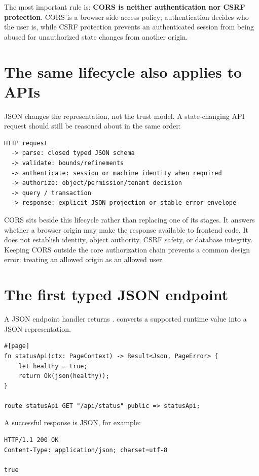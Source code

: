 The most important rule is: \textbf{CORS is neither authentication nor CSRF protection}. CORS is a browser-side access policy; authentication decides who the user is, while CSRF protection prevents an authenticated session from being abused for unauthorized state changes from another origin.

\section{The same lifecycle also applies to APIs}

JSON changes the representation, not the trust model. A state-changing API request should still be reasoned about in the same order:

\begin{lstlisting}
HTTP request
  -> parse: closed typed JSON schema
  -> validate: bounds/refinements
  -> authenticate: session or machine identity when required
  -> authorize: object/permission/tenant decision
  -> query / transaction
  -> response: explicit JSON projection or stable error envelope
\end{lstlisting}

CORS sits beside this lifecycle rather than replacing one of its stages. It answers whether a browser origin may make the response available to frontend code. It does not establish identity, object authority, CSRF safety, or database integrity. Keeping CORS outside the core authorization chain prevents a common design error: treating an allowed origin as an allowed user.

\section{The first typed JSON endpoint}

A JSON endpoint handler returns .  converts a supported runtime value into a JSON representation.

\begin{lstlisting}[language=Velran]
#[page]
fn statusApi(ctx: PageContext) -> Result<Json, PageError> {
    let healthy = true;
    return Ok(json(healthy));
}

route statusApi GET "/api/status" public => statusApi;
\end{lstlisting}

A successful response is JSON, for example:

\begin{lstlisting}
HTTP/1.1 200 OK
Content-Type: application/json; charset=utf-8

true
\end{lstlisting}

